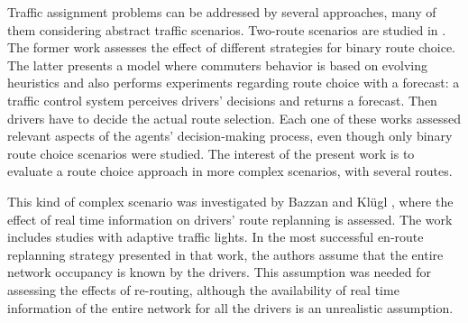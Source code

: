 \documentclass{RITA}
\begin{document}



Traffic assignment problems can be addressed by several approaches, many of them considering abstract traffic scenarios. Two-route scenarios are studied in \cite{Bazzan+2000icmas,Kluegl&Bazzan2004jasss}. The former work assesses the effect of different strategies for binary route choice. The latter presents a model where commuters behavior is based on evolving heuristics and also performs experiments regarding route choice with a forecast: a traffic control system perceives drivers' decisions and returns a forecast. Then drivers have to decide the actual route selection. Each one of these works assessed relevant aspects of the agents' decision-making process, even though only binary route choice scenarios were studied. The interest of the present work is to evaluate a route choice approach in more complex scenarios, with several routes.

This kind of complex scenario was investigated by Bazzan and Kl\"ugl \cite{Bazzan&Kluegl2008}, where the effect of real time information on drivers' route replanning is assessed. The work includes studies with adaptive traffic lights. In the most successful en-route replanning strategy presented in that work, the authors assume that the entire network occupancy is known by the drivers. This assumption was needed for assessing the effects of re-routing, although the availability of real time information of the entire network for all the drivers is an unrealistic assumption.
\end{document}
